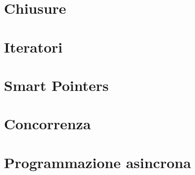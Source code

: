 \chapter{Chiusure}


\chapter{Iteratori}



\chapter{Smart Pointers}


\chapter{Concorrenza}


\chapter{Programmazione asincrona}

